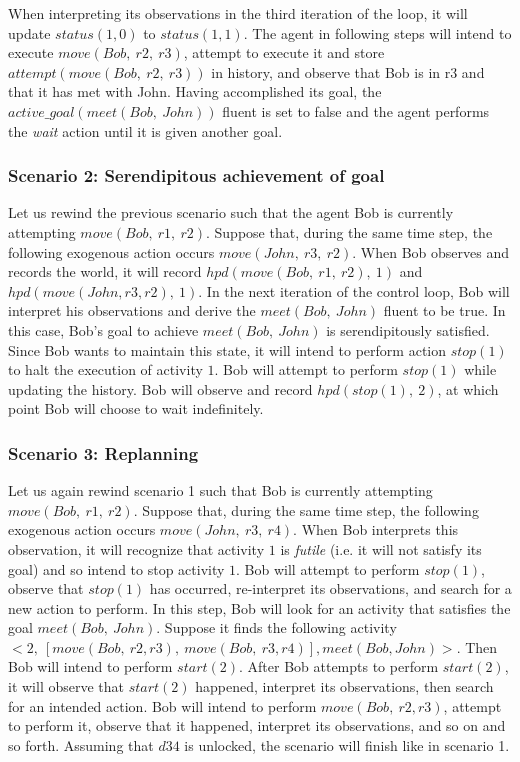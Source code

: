 When interpreting its observations in the third iteration of the loop, it will update $status(1,0)$ to $status(1,1)$.
The agent in following steps will intend to execute $move(Bob,\ r2,\ r3)$, attempt to execute it and store $attempt(move(Bob,\ r2,\ r3))$ in history, and observe that Bob is in r3 and that it has met with John.
Having accomplished its goal, the $active\_goal(meet(Bob,\ John))$ fluent is set to false and the agent performs the \textit{wait} action until it is given another goal.

\subsubsection{Scenario 2: Serendipitous achievement of goal~\cite{blount_towards_2014}}
\label{subsubsec:aia_scenario_2}

Let us rewind the previous scenario such that the agent Bob is currently attempting $move(Bob,\ r1,\ r2)$.
Suppose that, during the same time step, the following exogenous action occurs $move(John,\ r3,\ r2)$.
When Bob observes and records the world, it will record $hpd(move(Bob,\ r1,\ r2),\ 1)$ and $hpd(move(John,r3,r2),\ 1)$.
In the next iteration of the control loop, Bob will interpret his observations and derive the $meet(Bob,\ John)$ fluent to be true.
In this case, Bob's goal to achieve $meet(Bob,\ John)$ is serendipitously satisfied.
Since Bob wants to maintain this state, it will intend to perform action $stop(1)$ to halt the execution of activity $1$.
Bob will attempt to perform $stop(1)$ while updating the history.
Bob will observe and record $hpd(stop(1),\ 2)$, at which point Bob will choose to wait indefinitely.

\subsubsection{Scenario 3: Replanning~\cite{blount_towards_2014}}
\label{subsubsec:aia_scenario_3}

Let us again rewind scenario 1 such that Bob is currently attempting $move(Bob,\ r1,\ r2)$.
Suppose that, during the same time step, the following exogenous action occurs $move(John,\ r3,\ r4)$.
When Bob interprets this observation, it will recognize that activity $1$ is \textit{futile} (i.e. it will not satisfy its goal) and so intend to stop activity $1$.
Bob will attempt to perform $stop(1)$, observe that $stop(1)$ has occurred, re-interpret its observations, and search for a new action to perform.
In this step, Bob will look for an activity that satisfies the goal $meet(Bob,\ John)$.
Suppose it finds the following activity $<2,\ [move(Bob,\ r2,r3),\ move(Bob,\ r3,r4)],meet(Bob,John)>$.
Then Bob will intend to perform $start(2)$.
After Bob attempts to perform $start(2)$, it will observe that $start(2)$ happened, interpret its observations, then search for an intended action.
Bob will intend to perform $move(Bob,\ r2,r3)$, attempt to perform it, observe that it happened, interpret its observations, and so on and so forth.
Assuming that $d34$ is unlocked, the scenario will finish like in scenario 1.

